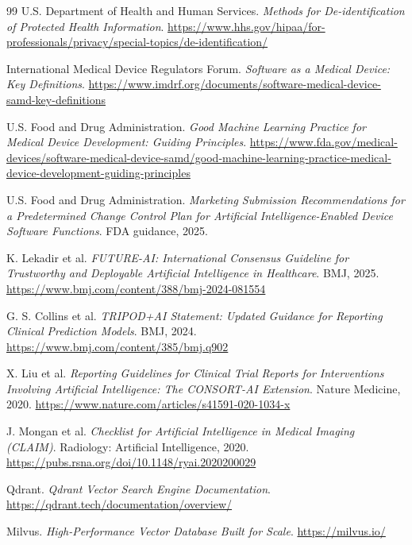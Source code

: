 \begin{thebibliography}{99}
U.S. Department of Health and Human Services.
\newblock \textit{Methods for De-identification of Protected Health Information}.
\newblock \url{https://www.hhs.gov/hipaa/for-professionals/privacy/special-topics/de-identification/}

International Medical Device Regulators Forum.
\newblock \textit{Software as a Medical Device: Key Definitions}.
\newblock \url{https://www.imdrf.org/documents/software-medical-device-samd-key-definitions}

U.S. Food and Drug Administration.
\newblock \textit{Good Machine Learning Practice for Medical Device Development: Guiding Principles}.
\newblock \url{https://www.fda.gov/medical-devices/software-medical-device-samd/good-machine-learning-practice-medical-device-development-guiding-principles}

U.S. Food and Drug Administration.
\newblock \textit{Marketing Submission Recommendations for a Predetermined Change Control Plan for Artificial Intelligence-Enabled Device Software Functions}.
\newblock FDA guidance, 2025.

K. Lekadir et al.
\newblock \textit{FUTURE-AI: International Consensus Guideline for Trustworthy and Deployable Artificial Intelligence in Healthcare}.
\newblock BMJ, 2025.
\newblock \url{https://www.bmj.com/content/388/bmj-2024-081554}

G. S. Collins et al.
\newblock \textit{TRIPOD+AI Statement: Updated Guidance for Reporting Clinical Prediction Models}.
\newblock BMJ, 2024.
\newblock \url{https://www.bmj.com/content/385/bmj.q902}

X. Liu et al.
\newblock \textit{Reporting Guidelines for Clinical Trial Reports for Interventions Involving Artificial Intelligence: The CONSORT-AI Extension}.
\newblock Nature Medicine, 2020.
\newblock \url{https://www.nature.com/articles/s41591-020-1034-x}

J. Mongan et al.
\newblock \textit{Checklist for Artificial Intelligence in Medical Imaging (CLAIM)}.
\newblock Radiology: Artificial Intelligence, 2020.
\newblock \url{https://pubs.rsna.org/doi/10.1148/ryai.2020200029}

Qdrant.
\newblock \textit{Qdrant Vector Search Engine Documentation}.
\newblock \url{https://qdrant.tech/documentation/overview/}

Milvus.
\newblock \textit{High-Performance Vector Database Built for Scale}.
\newblock \url{https://milvus.io/}


\end{thebibliography}
